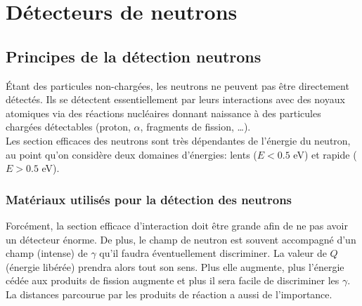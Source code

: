 \chapter{Détecteurs de neutrons}
\section{Principes de la détection neutrons}
Étant des particules non-chargées, les neutrons ne peuvent pas être directement détectés. Ils se
détectent essentiellement par leurs interactions avec des noyaux atomiques via des réactions
nucléaires donnant naissance à des particules chargées détectables (proton, $\alpha$, fragments de
fission, \dots).\\

Les section efficaces des neutrons sont très dépendantes de l'énergie du neutron, au point qu'on 
considère deux domaines d'énergies: lents ($E<0.5$ eV) et rapide ($E>0.5$ eV).

\subsection{Matériaux utilisés pour la détection des neutrons}%
Forcément, la section efficace d'interaction doit être grande afin de ne pas avoir un détecteur
énorme. De plus, le champ de neutron est souvent accompagné d'un champ (intense) de $\gamma$ qu'il
faudra éventuellement discriminer. La valeur de $Q$ (énergie libérée) prendra alors tout son sens. 
Plus elle augmente, plus l'énergie cédée aux produits de fission augmente et plus il sera facile de
discriminer les $\gamma$. La distances parcourue par les produits de réaction a aussi de l'importance.

